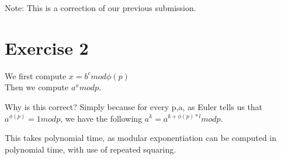 Note: This is a correction of our previous submission.

\section*{Exercise 2}

We first compute $x=b^c mod \phi(p)$ \\
Then we compute  $a^x mod p$. 

Why is this correct? Simply because for every p,a, as Euler tells us that$a^{\phi(p)}=1 mod p$, we have the following $ a^k = a^{k+\phi(p)*l} mod p $.

This takes polynomial time, as modular exponentiation can be computed in polynomial time, with use of repeated squaring.

